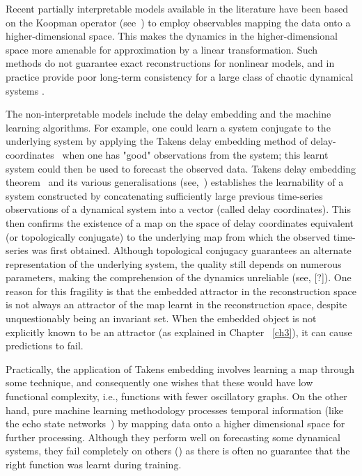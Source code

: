 \documentclass[a4paper,12pt,twoside]{report}
\begin{document}
Recent partially interpretable models available in the literature have been based on the Koopman operator (see~\cite{koopman1932dynamical,budivsic2012applied}) to employ observables mapping the data onto a higher-dimensional space. This makes the dynamics in the higher-dimensional space more amenable for approximation by a linear transformation. Such methods do not guarantee exact reconstructions for nonlinear models, and in practice provide poor long-term consistency for a large class of chaotic dynamical systems \cite{Supp}.

The non-interpretable models include the delay embedding and the machine learning algorithms. For example, one could learn a system conjugate to the underlying system by applying the Takens delay embedding method of delay-coordinates~\cite{takens1981detecting} when one has "good" observations from the system; this learnt system could then be used to forecast the observed data. 
Takens delay embedding theorem~\cite{takens1981detecting} and its various generalisations (see,~\cite{sauer1991embedology, stark1999delay, gutman2018embedding}) establishes the learnability of a system constructed by concatenating sufficiently large previous time-series observations of a dynamical system into a vector (called delay coordinates). This then confirms the existence of a map on the space of delay coordinates equivalent (or topologically conjugate) to the underlying map from which the observed time-series was first obtained. Although topological conjugacy guarantees an alternate representation of the underlying system, the quality still depends on numerous parameters, making the comprehension of the dynamics unreliable (see, [?]). One reason for this fragility is that the embedded attractor in the reconstruction space is not always an attractor of the map learnt in the reconstruction space, despite unquestionably being an invariant set. When the embedded object is not explicitly known to be an attractor (as explained in Chapter~ \ref{ch3}), it can cause predictions to fail.

Practically, the application of Takens embedding involves learning a map through some technique, and consequently one wishes that these would have low functional complexity\cite{manjunath2021universal}, i.e., functions with fewer oscillatory graphs. On the other hand, pure machine learning methodology processes temporal information (like the echo state networks~\cite{Manju_ESP, Manju_IEEE, grigoryeva2018echo}) by mapping data onto a higher dimensional space for further processing. Although they perform  well on forecasting some dynamical systems, they fail completely on others () as there is often no guarantee that the right function was learnt during training.
\end{document}
